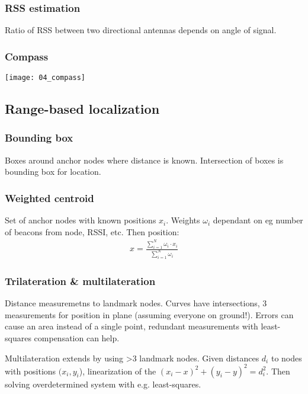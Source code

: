 \subsubsection{RSS estimation}

Ratio of RSS between two directional antennas depends on angle of signal.

\subsubsection{Compass}

\texttt{[image: 04\_compass]}

\subsection{Range-based localization}

\subsubsection{Bounding box}

Boxes around anchor nodes where distance is known. Intersection of boxes is
bounding box for location.

\subsubsection{Weighted centroid}

Set of anchor nodes with known positions $x_i$. Weights $\omega_i$ dependant on
eg number of beacons from node, RSSI, etc. Then position:
\begin{align*}
		x = \frac{\sum_{i = 1}^N \omega_i \cdot x_i}{\sum_{i = 1}^N \omega_i}
\end{align*}

\subsubsection{Trilateration \& multilateration}

Distance measuremetns to landmark nodes. Curves have intersections, 3
measurements for position in plane (assuming everyone on ground!). Errors can
cause an area instead of a single point, redundant measurements with
least-squares compensation can help.

Multilateration extends by using >3 landmark nodes. Given distances $d_i$ to
nodes with positions $(x_i, y_i$), linearization of the $(x_i - x)^2 + (y_i -
y)^2 = d_i^2$. Then solving overdetermined system with e.g. least-squares.

